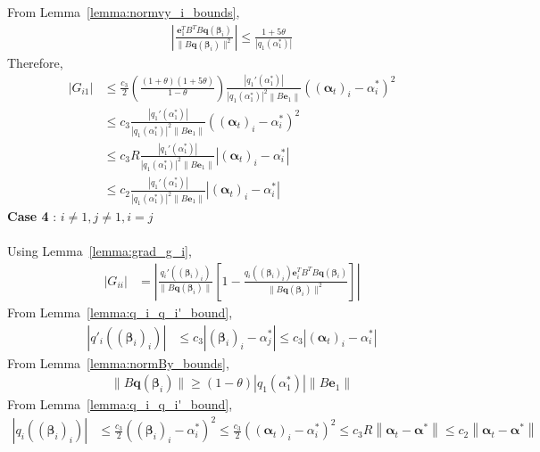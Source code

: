 \documentclass[letterpaper]{article}
\newcommand{\bas}[1]{\begin{align*}#1\end{align*}}
\newcommand{\balpha}{\pmb{\alpha}}
\newcommand{\be}{\pmb{e}}
\newcommand{\bbeta}{\pmb{\beta}}
\newcommand{\bq}{\pmb{q}}
\newcommand{\norm}[1]{\left\|#1\right\|}
\newcommand{\bb}[1]{\left(#1\right)}
\newcommand{\bbb}[1]{\left[#1\right]}
\begin{document}
From Lemma~\ref{lemma:normvy_i_bounds}, 
\bas{
    \left|\frac{\be_{1}^{T}B^{T}B\bq\bb{\bbeta_{i}}}{\|B\bq\bb{\bbeta_{i}}\|^{2}}\right| \leq \frac{1+5\theta}{\left|q_{1}\bb{\alpha^{*}_{1}}\right|}
}
Therefore, 
\bas{
    \left|G_{i1}\right| &\leq \frac{c_{3}}{2}\bb{\frac{\bb{1+\theta}\bb{1+5\theta}}{1-\theta}}\frac{\left|q_{1}'\bb{\alpha^{*}_{1}}\right|}{\left|q_{1}\bb{\alpha^{*}_{1}}\right|^{2}\left\|B\be_{1}\right\|}\bb{\bb{\balpha_{t}}_{i} - \alpha^{*}_{i}}^{2} \\
    &\leq c_{3}\frac{\left|q_{1}'\bb{\alpha^{*}_{1}}\right|}{\left|q_{1}\bb{\alpha^{*}_{1}}\right|^{2}\left\|B\be_{1}\right\|}\bb{\bb{\balpha_{t}}_{i} - \alpha^{*}_{i}}^{2} \\
    &\leq c_{3}R\frac{\left|q_{1}'\bb{\alpha^{*}_{1}}\right|}{\left|q_{1}\bb{\alpha^{*}_{1}}\right|^{2}\left\|B\be_{1}\right\|}\left|\bb{\balpha_{t}}_{i} - \alpha^{*}_{i}\right| \\
    &\leq c_{2}\frac{\left|q_{1}'\bb{\alpha^{*}_{1}}\right|}{\left|q_{1}\bb{\alpha^{*}_{1}}\right|^{2}\left\|B\be_{1}\right\|}\left|\bb{\balpha_{t}}_{i} - \alpha^{*}_{i}\right|
}
\textbf{Case 4} : $i \neq 1, j \neq 1, i = j$ \\ \\
Using Lemma~\ref{lemma:grad_g_i},
\bas{
    \left|G_{ii}\right| &= \left|\frac{q_{i}'\bb{\bb{\bbeta_{i}}_{i}}}{\|B\bq\bb{\bbeta_{i}}\|}\bbb{1 - \frac{q_{i}\bb{\bb{\bbeta_{i}}_{i}}\be_{i}^{T}B^{T}B\bq\bb{\bbeta_{i}}}{\|B\bq\bb{\bbeta_{i}}\|^{2}}}\right|
}
From Lemma~\ref{lemma:q_i_q_i'_bound},
\bas{
    \left|q'_{i}\bb{\bb{\bbeta_{i}}_{i}}\right| &\leq c_{3}\left|\bb{\bbeta_{i}}_{i} - \alpha^{*}_{j}\right| \leq c_{3}\left|\bb{\balpha_{t}}_{i} - \alpha^{*}_{i}\right|
}
From Lemma~\ref{lemma:normBy_bounds}, 
\bas{
    \|B\bq\bb{\bbeta_{i}}\| \geq \bb{1-\theta}\left|q_{1}\bb{\alpha^{*}_{1}}\right|\left\|B\be_{1}\right\|
}
From Lemma~\ref{lemma:q_i_q_i'_bound}, 
\bas{
    \left|q_{i}\bb{\bb{\bbeta_{i}}_{i}}\right| &\leq \frac{c_{3}}{2}\bb{\bb{\bbeta_{i}}_{i} - \alpha^{*}_{i}}^{2} \leq \frac{c_{3}}{2}\bb{\bb{\balpha_{t}}_{i} - \alpha^{*}_{i}}^{2} \leq c_{3}R\norm{\balpha_{t}-\balpha^{*}} \leq c_{2}\norm{\balpha_{t}-\balpha^{*}}
}
\end{document}
